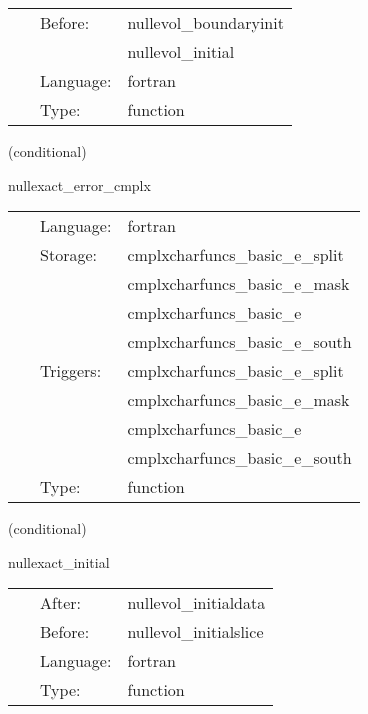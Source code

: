 \hspace{5mm}

 \begin{tabular*}{160mm}{cll} 
~ & Before:  & nullevol\_boundaryinit \\ 
~& ~ &nullevol\_initial\\ 
~ & Language:  & fortran \\ 
~ & Type:  & function \\ 
\end{tabular*} 


\vspace{5mm}

   (conditional) 

\hspace{5mm} nullexact\_error\_cmplx 

\hspace{5mm}{\it error in characteristic evolution variables } 


\hspace{5mm}

 \begin{tabular*}{160mm}{cll} 
~ & Language:  & fortran \\ 
~ & Storage:  & cmplxcharfuncs\_basic\_e\_split \\ 
~& ~ &cmplxcharfuncs\_basic\_e\_mask\\ 
~& ~ &cmplxcharfuncs\_basic\_e\\ 
~& ~ &cmplxcharfuncs\_basic\_e\_south\\ 
~ & Triggers:  & cmplxcharfuncs\_basic\_e\_split \\ 
~& ~ &cmplxcharfuncs\_basic\_e\_mask\\ 
~& ~ &cmplxcharfuncs\_basic\_e\\ 
~& ~ &cmplxcharfuncs\_basic\_e\_south\\ 
~ & Type:  & function \\ 
\end{tabular*} 


\vspace{5mm}

   (conditional) 

\hspace{5mm} nullexact\_initial 

\hspace{5mm}{\it exact initial data for j } 


\hspace{5mm}

 \begin{tabular*}{160mm}{cll} 
~ & After:  & nullevol\_initialdata \\ 
~ & Before:  & nullevol\_initialslice \\ 
~ & Language:  & fortran \\ 
~ & Type:  & function \\ 
\end{tabular*} 


